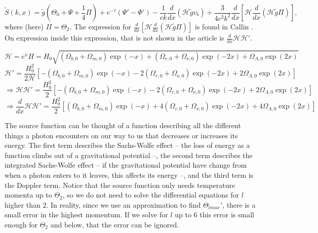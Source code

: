 \documentclass[a4paper,norsk, 10pt]{article}
\begin{document}
\begin{equation}\label{eq:S}
\tilde{S}(k,x) = \tilde{g}\left(\Theta_0 + \Psi + \frac{1}{4}\Pi\right) +e^{-\tau}\left(\Psi' - \Phi'\right)  - \frac{1}{ck}\frac{d}{dx}\left(\mathcal{H}\tilde{g}v_b\right) + \frac{3}{4c^2k^2}\frac{d}{dx}\left[\mathcal{H}\frac{d}{dx}\left(\mathcal{H}\tilde{g}\Pi\right) \right],
\end{equation}
where (here) $\Pi = \Theta_2$. The expression for $\frac{d}{dx}\left[\mathcal{H}\frac{d}{dx}\left(\mathcal{H}\tilde{g}\Pi\right) \right]$ is found in Callin \cite{callin}. On expression inside this expression, that is not shown in the article is $\frac{d}{dx}\mathcal{H}\mathcal{H}'$.

\begin{equation}
\mathcal{H} = e^x H = H_0 \sqrt{(\Omega_{b,0} + \Omega_{m,0})\exp(-x) + (\Omega_{r,0} + \Omega_{\nu,0})\exp(-2x) + \Omega_{\Lambda,0}\exp(2x)}    
\end{equation}
\begin{equation}
\mathcal{H}' = \frac{H_0^2}{2\mathcal{H}}\left[-(\Omega_{b,0} + \Omega_{m,0})\exp(-x) -2 (\Omega_{r,0} + \Omega_{\nu,0})\exp(-2x) + 2\Omega_{\Lambda,0}\exp(2x)\right]  
\end{equation}
\begin{equation}
\Rightarrow \mathcal{H}\mathcal{H}' = \frac{H_0^2}{2}\left[-(\Omega_{b,0} + \Omega_{m,0})\exp(-x) -2 (\Omega_{r,0} + \Omega_{\nu,0})\exp(-2x) + 2\Omega_{\Lambda,0}\exp(2x)\right]
\end{equation}
\begin{equation}
\Rightarrow \frac{d}{dx} \mathcal{H}\mathcal{H}' = \frac{H_0^2}{2}\left[(\Omega_{b,0} + \Omega_{m,0})\exp(-x) +4 (\Omega_{r,0} + \Omega_{\nu,0})\exp(-2x) + 4\Omega_{\Lambda,0}\exp(2x)\right]
\end{equation}

The source function can be thought of a function describing all the different things a photon encounters on our way to us that decreases or increases its energy. The first term describes the Sachs-Wolfe effect -- the loss of energy as a function climbs out of a gravitational potential --, the second term describes the integrated Sachs-Wolfe effect -- if the gravitational potential have change from when a photon enters to it leaves, this affects its energy --, and the third term is the Doppler term. Notice that the source function only needs temperature momenta up to $\Theta_2$, so we do not need to solve the differential equations for $l$ higher than $2$. In reality, since we use an approximation to find $\Theta_{lmax}'$, there is a small error in the highest momentum. If we solve for $l$ up to $6$ this error is small enough for $\Theta_2$ and below, that the error can be ignored.
\end{document}
